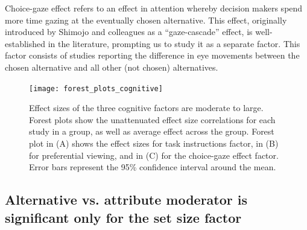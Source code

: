 Choice-gaze effect refers to an effect in attention whereby decision makers spend more time gazing at the eventually chosen alternative. This effect, originally introduced by Shimojo and colleagues \citep{shimojo2003a} as a ``gaze-cascade'' effect, is well-established in the literature, prompting us to study it as a separate factor. This factor consists of studies reporting the difference in eye movements between the chosen alternative and all other (not chosen) alternatives. 


\begin{figure}[!h]
\texttt{[image: forest\_plots\_cognitive]}
\centering
\caption{Effect sizes of the three cognitive factors are moderate to large. Forest plots show the unattenuated effect size correlations for each study in a group, as well as average effect across the group. Forest plot in (A) shows the effect sizes for task instructions factor, in (B) for preferential viewing, and in (C) for the choice-gaze effect factor. Error bars represent the 95\% confidence interval around the mean.}
\label{fig:forest_plots_cognitive}
\end{figure}


\subsection{Alternative vs. attribute moderator is significant only for the set size factor}

